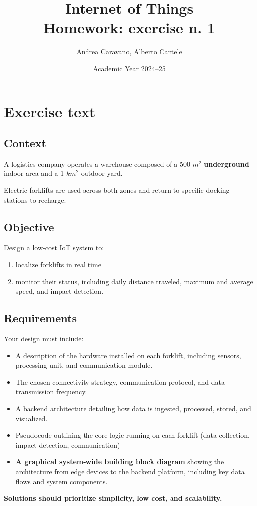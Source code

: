 \documentclass[a4paper,11pt]{article} %
\title{\textbf{Internet of Things}\\Homework: exercise n. 1}
\author{Andrea Caravano, Alberto Cantele}
\date{Academic Year 2024--25}
\begin{document}
\maketitle


\section*{Exercise text}
\subsection*{Context}
A logistics company operates a warehouse composed of a 500 $m^2$ \textbf{underground} indoor area and a 1 $km^2$ outdoor yard.

Electric forklifts are used across both zones and return to specific docking stations to recharge.
\subsection*{Objective}
Design a low-cost IoT system to:
\begin{enumerate}
    \item localize forklifts in real time
    \item monitor their status, including daily distance traveled, maximum and average speed, and impact detection.
\end{enumerate}
\subsection*{Requirements}
Your design must include:
\begin{itemize}
    \item A description of the hardware installed on each forklift, including sensors, processing unit, and communication module.
    \item The chosen connectivity strategy, communication protocol, and data transmission frequency.
    \item A backend architecture detailing how data is ingested, processed, stored, and visualized.
    \item Pseudocode outlining the core logic running on each forklift (data collection, impact detection, communication)
    \item \textbf{A graphical system-wide building block diagram} showing the architecture from edge devices to the backend platform, including key data flows and system components.
\end{itemize}
\textbf{Solutions should prioritize simplicity, low cost, and scalability.}
\end{document}
